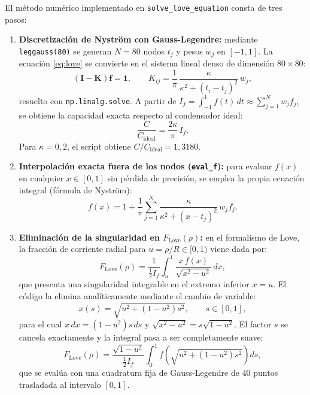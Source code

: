 \documentclass[11pt]{article}
\begin{document}
El método numérico implementado en \texttt{solve\_love\_equation} consta de tres pasos:

\begin{enumerate}
    \item \textbf{Discretización de Nyström con Gauss-Legendre:} mediante \texttt{leggauss(80)} se generan $N = 80$ nodos $t_j$ y pesos $w_j$ en $[-1, 1]$. La ecuación \eqref{eq:love} se convierte en el sistema lineal denso de dimensión $80 \times 80$:
    \begin{equation}
        \left( \mathbf{I} - \mathbf{K} \right) \mathbf{f} = \mathbf{1}, \qquad K_{ij} = \frac{1}{\pi}\,\frac{\kappa}{\kappa^2 + (t_i - t_j)^2}\,w_j,
    \end{equation}
    resuelto con \texttt{np.linalg.solve}. A partir de $I_f = \int_{-1}^{1} f(t)\,dt \approx \sum_{j=1}^{N} w_j f_j$, se obtiene la capacidad exacta respecto al condensador ideal:
    \begin{equation}
        \frac{C}{C_{\mathrm{ideal}}} = \frac{2\kappa}{\pi}\,I_f.
    \end{equation}
    Para $\kappa = 0{,}2$, el script obtiene $C / C_{\mathrm{ideal}} = 1{,}3180$.

    \item \textbf{Interpolación exacta fuera de los nodos (\texttt{eval\_f}):} para evaluar $f(x)$ en cualquier $x \in [0, 1]$ sin pérdida de precisión, se emplea la propia ecuación integral (fórmula de Nyström):
    \begin{equation}
        f(x) = 1 + \frac{1}{\pi} \sum_{j=1}^{N} \frac{\kappa}{\kappa^2 + (x - t_j)^2}\,w_j f_j.
    \end{equation}

    \item \textbf{Eliminación de la singularidad en $F_{\mathrm{Love}}(\rho)$:} en el formalismo de Love, la fracción de corriente radial para $u = \rho/R \in [0, 1)$ viene dada por:
    \begin{equation}
        F_{\mathrm{Love}}(\rho) = \frac{1}{\frac{1}{2} I_f} \int_{u}^{1} \frac{x\,f(x)}{\sqrt{x^2 - u^2}}\,dx,
    \end{equation}
    que presenta una singularidad integrable en el extremo inferior $x = u$. El código la elimina analíticamente mediante el cambio de variable:
    \begin{equation}
        x(s) = \sqrt{u^2 + (1 - u^2)s^2}, \qquad s \in [0, 1],
    \end{equation}
    para el cual $x\,dx = (1 - u^2)s\,ds$ y $\sqrt{x^2 - u^2} = s\sqrt{1 - u^2}$. El factor $s$ se cancela exactamente y la integral pasa a ser completamente suave:
    \begin{equation}
        F_{\mathrm{Love}}(\rho) = \frac{\sqrt{1 - u^2}}{\frac{1}{2} I_f} \int_{0}^{1} f\!\left( \sqrt{u^2 + (1 - u^2)s^2} \right) ds,
    \end{equation}
    que se evalúa con una cuadratura fija de Gauss-Legendre de 40 puntos trasladada al intervalo $[0, 1]$.
\end{enumerate}
\end{document}

